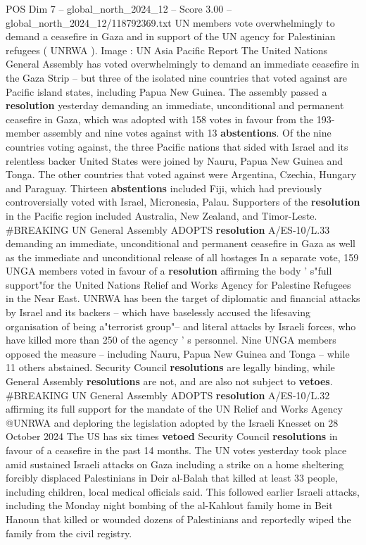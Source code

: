 \begin{textsample}{POS Dim 7 – global\_north\_2024\_12 – Score 3.00 – global\_north\_2024\_12/118792369.txt}  \label{ex:f7_pos_296}
UN members vote overwhelmingly to demand a ceasefire in Gaza and in support of the UN agency for Palestinian refugees ( UNRWA ).
Image : UN Asia Pacific Report The United Nations General Assembly has voted overwhelmingly to demand an immediate ceasefire in the Gaza Strip -- but three of the isolated nine countries that voted against are Pacific island states, including Papua New Guinea.
The assembly passed a \textbf{resolution} yesterday demanding an immediate, unconditional and permanent ceasefire in Gaza, which was adopted with 158 votes in favour from the 193-member assembly and nine votes against with 13 \textbf{abstentions}.
Of the nine countries voting against, the three Pacific nations that sided with Israel and its relentless backer United States were joined by Nauru, Papua New Guinea and Tonga.
The other countries that voted against were Argentina, Czechia, Hungary and Paraguay.
Thirteen \textbf{abstentions} included Fiji, which had previously controversially voted with Israel, Micronesia, Palau.
Supporters of the \textbf{resolution} in the Pacific region included Australia, New Zealand, and Timor-Leste. \#BREAKING UN General Assembly ADOPTS \textbf{resolution} A/ES-10/L.33 demanding an immediate, unconditional and permanent ceasefire in Gaza as well as the immediate and unconditional release of all hostages In a separate vote, 159 UNGA members voted in favour of a \textbf{resolution} affirming the body ' s"full support"for the United Nations Relief and Works Agency for Palestine Refugees in the Near East.
UNRWA has been the target of diplomatic and financial attacks by Israel and its backers -- which have baselessly accused the lifesaving organisation of being a"terrorist group"-- and literal attacks by Israeli forces, who have killed more than 250 of the agency ' s personnel.
Nine UNGA members opposed the measure -- including Nauru, Papua New Guinea and Tonga -- while 11 others abstained.
Security Council \textbf{resolutions} are legally binding, while General Assembly \textbf{resolutions} are not, and are also not subject to \textbf{vetoes}. \#BREAKING UN General Assembly ADOPTS \textbf{resolution} A/ES-10/L.32 affirming its full support for the mandate of the UN Relief and Works Agency @UNRWA and deploring the legislation adopted by the Israeli Knesset on 28 October 2024 The US has six times \textbf{vetoed} Security Council \textbf{resolutions} in favour of a ceasefire in the past 14 months.
The UN votes yesterday took place amid sustained Israeli attacks on Gaza including a strike on a home sheltering forcibly displaced Palestinians in Deir al-Balah that killed at least 33 people, including children, local medical officials said.
This followed earlier Israeli attacks, including the Monday night bombing of the al-Kahlout family home in Beit Hanoun that killed or wounded dozens of Palestinians and reportedly wiped the family from the civil registry.

\end{textsample}
